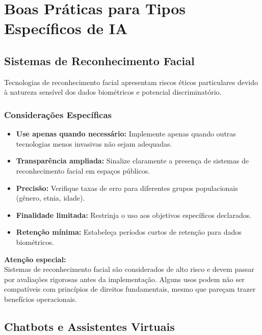 \documentclass[12pt,a4paper]{article}
\begin{document}
\newpage
\section{Boas Práticas para Tipos Específicos de IA}

\subsection{Sistemas de Reconhecimento Facial}

Tecnologias de reconhecimento facial apresentam riscos éticos particulares devido à natureza sensível dos dados biométricos e potencial discriminatório.

\subsubsection{Considerações Específicas}
\begin{itemize}
    \item \textbf{Use apenas quando necessário:} Implemente apenas quando outras tecnologias menos invasivas não sejam adequadas.
    \item \textbf{Transparência ampliada:} Sinalize claramente a presença de sistemas de reconhecimento facial em espaços públicos.
    \item \textbf{Precisão:} Verifique taxas de erro para diferentes grupos populacionais (gênero, etnia, idade).
    \item \textbf{Finalidade limitada:} Restrinja o uso aos objetivos específicos declarados.
    \item \textbf{Retenção mínima:} Estabeleça períodos curtos de retenção para dados biométricos.
\end{itemize}

\begin{tcolorbox}[warning]
\textbf{Atenção especial:} \\
Sistemas de reconhecimento facial são considerados de alto risco e devem passar por avaliações rigorosas antes da implementação. Alguns usos podem não ser compatíveis com princípios de direitos fundamentais, mesmo que pareçam trazer benefícios operacionais.
\end{tcolorbox}

\subsection{Chatbots e Assistentes Virtuais}
\end{document}

